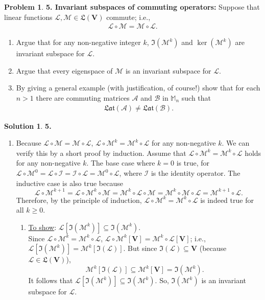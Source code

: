 \documentclass{article}
\theoremstyle{definition}
\newtheorem*{prob*}{Problem}
\newtheorem*{sln*}{Solution}
\newcommand{\V}{\mathbf{V}}
\newcommand{\lag}{\mathcal{L}}
\newcommand{\M}{\mathcal{M}}
\begin{document}
\newpage


\begin{prob*} \textbf{5. Invariant subspaces of commuting operators:} Suppose that linear functions $\lag, \mathcal{M} \in \mathfrak{L}(\V)$ commute; i.e.,
	\begin{align*}
	\lag \circ \mathcal{M} = \mathcal{M}\circ \lag.
	\end{align*}
	\begin{enumerate}
		\item Argue that for any non-negative integer $k$, $\Im(\mathcal{M}^k)$ and $\ker(\mathcal{M}^k)$ are invariant subspace for $\lag$.
		\item Argue that every eigenspace of $\mathcal{M}$ is an invariant subspace for $\lag$.
		\item By giving a general example (with justification, of course!) show that for each $n>1$ there are commuting matrices $\mathcal{A}$ and $\mathcal{B}$ in $\mathbb{M}_n$ such that
		\begin{align*}
		\mathfrak{Lat}(\mathcal{A}) \neq \mathfrak{Lat}(\mathcal{B}).
		\end{align*}
	\end{enumerate}
	\begin{sln*}\textbf{5.}
		$\,$
		\begin{enumerate}
			\item Because $\lag \circ \M = \M \circ \lag$, $\lag \circ \M^k = \M^k \circ \lag$ for any non-negative $k$. We can verify this by a short proof by induction. Assume that $\lag \circ \M^k = \M^k \circ \lag$ holds for any non-negative $k$. The base case where $k=0$ is  true, for $\lag\circ \M^0 = \lag \circ \mathcal{I} = \mathcal{I} \circ \lag = \M^0 \circ \lag$, where $\mathcal{I}$ is the identity operator. The inductive case is also true because $$ \lag\circ \M^{k+1} = \lag \circ \M^k \circ \M = \M^k\circ\lag\circ\M = \M^k\circ \M \circ \lag = \M^{k+1}\circ \lag.$$ Therefore, by the principle of induction, $\lag \circ \M^k = \M^k \circ \lag$ is indeed true for all $k\geq 0$.
			
			\begin{enumerate}
				\item \underline{To show}: $\lag\left[ \Im(\M^k)\right] \subseteq \Im(\M^k)$.\\
				
				 Since $\lag\circ \M^k = \M^k \circ \lag$,  $\lag\circ \M^k[\V] = \M^k\circ\lag[\V]$; i.e., $\lag[\Im(\M^k)] = \M^k[\Im(\lag)]$. But since $\Im(\lag) \subseteq \V$ (because $\lag \in \mathfrak{L}(\V)$), $$\M^k[\Im(\lag)] \subseteq \M^k[\V] = \Im(\M^k).$$ It follows that $\lag[\Im(\M^k)] \subseteq \Im(\M^k)$. So, $\Im(\M^k)$ is an invariant subspace for $\lag$.\\
				

\end{enumerate}
\end{enumerate}
\end{sln*}
\end{prob*}
\end{document}
